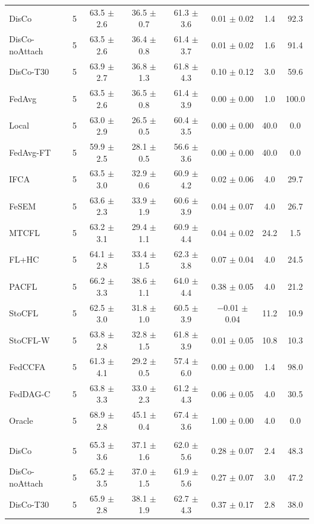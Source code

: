 {\begin{tabular}{l r c c c c c c}
DisCo & 5 & 63.5 $\pm$ 2.6 & 36.5 $\pm$ 0.7 & 61.3 $\pm$ 3.6 & 0.01 $\pm$ 0.02 & 1.4 & 92.3 \\
DisCo-noAttach & 5 & 63.5 $\pm$ 2.6 & 36.4 $\pm$ 0.8 & 61.4 $\pm$ 3.7 & 0.01 $\pm$ 0.02 & 1.6 & 91.4 \\
DisCo-T30 & 5 & 63.9 $\pm$ 2.7 & 36.8 $\pm$ 1.3 & 61.8 $\pm$ 4.3 & 0.10 $\pm$ 0.12 & 3.0 & 59.6 \\
FedAvg & 5 & 63.5 $\pm$ 2.6 & 36.5 $\pm$ 0.8 & 61.4 $\pm$ 3.9 & 0.00 $\pm$ 0.00 & 1.0 & 100.0 \\
Local & 5 & 63.0 $\pm$ 2.9 & 26.5 $\pm$ 0.5 & 60.4 $\pm$ 3.5 & 0.00 $\pm$ 0.00 & 40.0 & 0.0 \\
FedAvg-FT & 5 & 59.9 $\pm$ 2.5 & 28.1 $\pm$ 0.5 & 56.6 $\pm$ 3.6 & 0.00 $\pm$ 0.00 & 40.0 & 0.0 \\
IFCA & 5 & 63.5 $\pm$ 3.0 & 32.9 $\pm$ 0.6 & 60.9 $\pm$ 4.2 & 0.02 $\pm$ 0.06 & 4.0 & 29.7 \\
FeSEM & 5 & 63.6 $\pm$ 2.3 & 33.9 $\pm$ 1.9 & 60.6 $\pm$ 3.9 & 0.04 $\pm$ 0.07 & 4.0 & 26.7 \\
MTCFL & 5 & 63.2 $\pm$ 3.1 & 29.4 $\pm$ 1.1 & 60.9 $\pm$ 4.4 & 0.04 $\pm$ 0.02 & 24.2 & 1.5 \\
FL+HC & 5 & 64.1 $\pm$ 2.8 & 33.4 $\pm$ 1.5 & 62.3 $\pm$ 3.8 & 0.07 $\pm$ 0.04 & 4.0 & 24.5 \\
PACFL & 5 & 66.2 $\pm$ 3.3 & 38.6 $\pm$ 1.1 & 64.0 $\pm$ 4.4 & 0.38 $\pm$ 0.05 & 4.0 & 21.2 \\
StoCFL & 5 & 62.5 $\pm$ 3.0 & 31.8 $\pm$ 1.0 & 60.5 $\pm$ 3.9 & $-$0.01 $\pm$ 0.04 & 11.2 & 10.9 \\
StoCFL-W & 5 & 63.8 $\pm$ 2.8 & 32.8 $\pm$ 1.5 & 61.8 $\pm$ 3.9 & 0.01 $\pm$ 0.05 & 10.8 & 10.3 \\
FedCCFA & 5 & 61.3 $\pm$ 4.1 & 29.2 $\pm$ 0.5 & 57.4 $\pm$ 6.0 & 0.00 $\pm$ 0.00 & 1.4 & 98.0 \\
FedDAG-C & 5 & 63.8 $\pm$ 3.3 & 33.0 $\pm$ 2.3 & 61.2 $\pm$ 4.3 & 0.06 $\pm$ 0.05 & 4.0 & 30.5 \\
Oracle & 5 & 68.9 $\pm$ 2.8 & 45.1 $\pm$ 0.4 & 67.4 $\pm$ 3.6 & 1.00 $\pm$ 0.00 & 4.0 & 0.0 \\
\addlinespace
\multicolumn{8}{l}{\textit{CIFAR-10 label swap}} \\
DisCo & 5 & 65.3 $\pm$ 3.6 & 37.1 $\pm$ 1.6 & 62.0 $\pm$ 5.6 & 0.28 $\pm$ 0.07 & 2.4 & 48.3 \\
DisCo-noAttach & 5 & 65.2 $\pm$ 3.5 & 37.0 $\pm$ 1.5 & 61.9 $\pm$ 5.6 & 0.27 $\pm$ 0.07 & 3.0 & 47.2 \\
DisCo-T30 & 5 & 65.9 $\pm$ 2.8 & 38.1 $\pm$ 1.9 & 62.7 $\pm$ 4.3 & 0.37 $\pm$ 0.17 & 2.8 & 38.0 \\

\end{tabular}}
